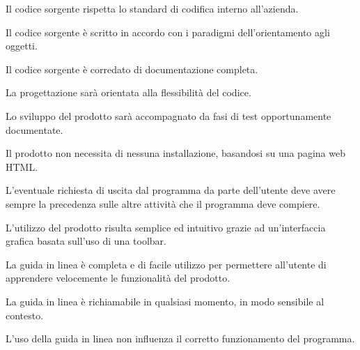 
\begin{elenconumerato}{\subsubsecindent}
\item Il codice sorgente rispetta lo standard di codifica interno all'azienda.
\item Il codice sorgente \`e scritto in accordo con i paradigmi dell'orientamento agli oggetti.
\item Il codice sorgente \`e corredato di documentazione completa.
\item La progettazione sar\`a orientata alla flessibilit\`a del codice.
\item Lo sviluppo del prodotto sar\`a accompagnato da fasi di test opportunamente documentate.
\item Il prodotto non necessita di nessuna installazione, basandosi su una pagina web HTML.
\item L'eventuale richiesta di uscita dal programma da parte dell'utente deve avere sempre la precedenza sulle altre attivit\`a che il programma deve compiere.
\end{elenconumerato}





\begin{elenconumerato}{\subsubsecindent}
\item L'utilizzo del prodotto risulta semplice ed intuitivo grazie ad un'interfaccia grafica basata sull'uso di una toolbar.
\item La guida in linea \`e completa e di facile utilizzo per permettere all'utente di apprendere velocemente le funzionalit\`a del prodotto.
\item La guida in linea \`e richiamabile in qualsiasi momento, in modo sensibile al contesto.
\item L'uso della guida in linea non influenza il corretto funzionamento del programma. 
\end{elenconumerato}

